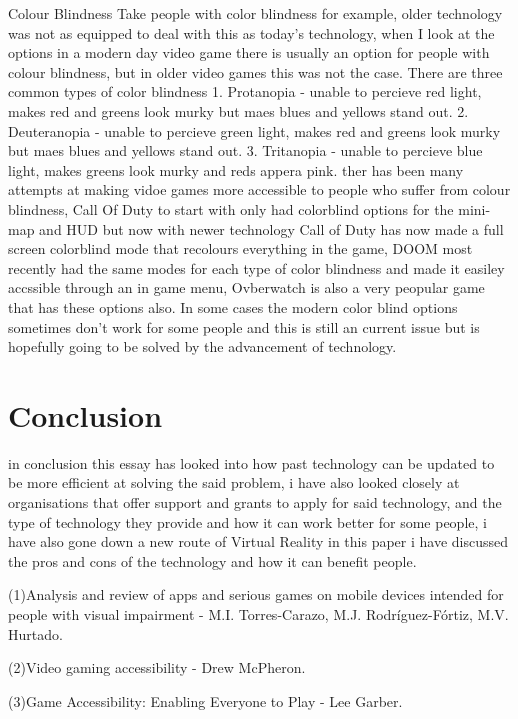 \documentclass{scrartcl}
\begin{document}
Colour Blindness
Take people with color blindness for example, older technology was not as equipped to deal with this as today's technology, when I look at the options in a modern day video game there is usually an option for people with colour blindness, but in older video games this was not the case.
There are three common types of color blindness
1. Protanopia - unable to percieve red light, makes red and greens look murky but maes blues and yellows stand out.
2. Deuteranopia - unable to percieve green light, makes red and greens look murky but maes blues and yellows stand out.
3. Tritanopia - unable to percieve blue light, makes greens look murky and reds appera pink.
ther has been many attempts at making vidoe games more accessible to people who suffer from colour blindness, Call Of Duty to start with only had colorblind options for the mini-map and HUD but now with newer technology Call of Duty has now made a full screen colorblind mode that recolours everything in the game, DOOM most recently had the same modes for each type of color blindness and made it easiley accssible through an in game menu, Ovberwatch is also a very peopular game that has these options also.
 In some cases the modern color blind options sometimes don't work for some people and this is still an current issue but is hopefully going to be solved by the advancement of technology.


\section{Conclusion}
in conclusion this essay has looked into how past technology can be updated to be more efficient at solving the said problem, i have also looked closely at organisations that offer support and grants to apply for said technology, and the type of technology they provide and how it can work better for some people, i have also gone down a new route of Virtual Reality in this paper i have discussed the pros and cons of the technology and how it can benefit people.




(1)Analysis and review of apps and serious games on mobile devices intended for people with visual impairment - M.I. Torres-Carazo, M.J. Rodríguez-Fórtiz, M.V. Hurtado.

(2)Video gaming accessibility - Drew McPheron.

(3)Game Accessibility: Enabling Everyone to Play - Lee Garber.
\end{document}
